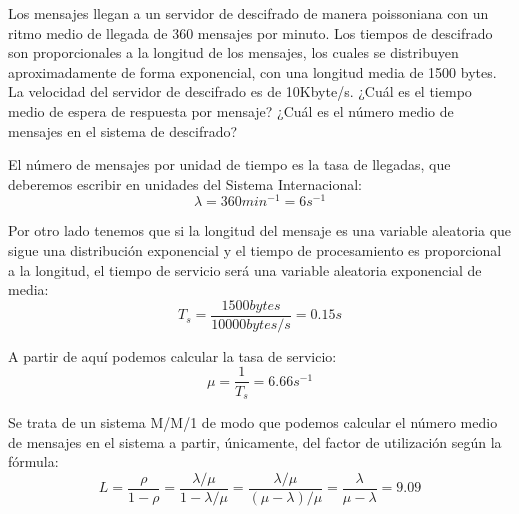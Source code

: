 \begin{problem}[1]
Los mensajes llegan a un servidor de descifrado de manera poissoniana con un ritmo medio de llegada de 360 mensajes por minuto. Los tiempos de descifrado son proporcionales a la longitud de los mensajes, los cuales se distribuyen aproximadamente de forma exponencial, con una longitud media de 1500 bytes. La velocidad del servidor de descifrado es de 10Kbyte/s. ¿Cuál es el tiempo medio de espera de respuesta por mensaje? ¿Cuál es el número medio de mensajes en el sistema de descifrado?

\solution

El número de mensajes por unidad de tiempo es la tasa de llegadas, que deberemos escribir en unidades del Sistema Internacional:
\[λ = 360 min^{-1}=6 s^{-1}\]

Por otro lado tenemos que si la longitud del mensaje es una variable aleatoria que sigue una distribución exponencial y el tiempo de procesamiento es proporcional a la longitud, el tiempo de servicio será una variable aleatoria exponencial de media:
\[T_s = \frac{1500 bytes}{10000 bytes/s} = \boxed{0.15s}\]

A partir de aquí podemos calcular la tasa de servicio:
\[μ = \frac{1}{T_s} = 6.66 s^{-1}\]

Se trata de un sistema M/M/1 de modo que podemos calcular el número medio de mensajes en el sistema a partir, únicamente, del factor de utilización según la fórmula:
\[L=\frac{ρ}{1-ρ}=\frac{λ/μ}{1-λ/μ}=\frac{λ/μ}{(μ-λ)/μ}=\frac{λ}{μ-λ}=\boxed{9.09}\]


\end{problem}


